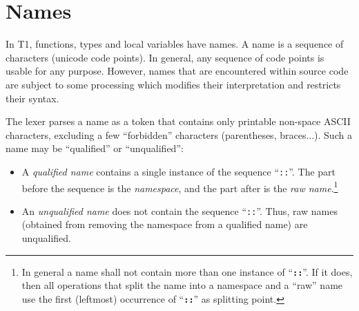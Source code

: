 \section{Names}

In T1, functions, types and local variables have names. A name is a
sequence of characters (unicode code points). In general, any sequence
of code points is usable for any purpose. However, names that are
encountered within source code are subject to some processing which
modifies their interpretation and restricts their syntax.

The lexer parses a name as a token that contains only printable non-space
ASCII characters, excluding a few ``forbidden'' characters (parentheses,
braces...). Such a name may be ``qualified'' or ``unqualified'':
\begin{itemize}

    \item A \emph{qualified name} contains a single instance of the
    sequence ``\verb|::|''. The part before the sequence is the
    \emph{namespace}, and the part after is the \emph{raw
    name}.\footnote{In general a name shall not contain more than one
    instance of ``\texttt{\textbf{::}}''. If it does, then all
    operations that split the name into a namespace and a ``raw'' name
    use the first (leftmost) occurrence of ``\texttt{\textbf{::}}'' as
    splitting point.}

    \item An \emph{unqualified name} does not contain the sequence
    ``\verb|::|''. Thus, raw names (obtained from removing the namespace
    from a qualified name) are unqualified.

\end{itemize}

